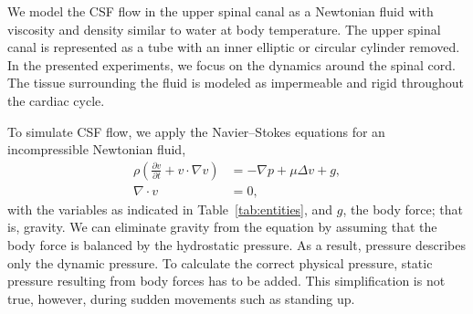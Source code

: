 We model the CSF flow in the upper spinal canal as a Newtonian fluid
 with viscosity and density similar to water
at body temperature. The upper spinal canal is represented as a tube
with an inner elliptic or circular cylinder removed.  In the presented
experiments, we focus on the dynamics around the spinal cord. The
tissue surrounding the fluid is modeled as impermeable and rigid
throughout the cardiac cycle.

To simulate CSF flow, we apply the
Navier--Stokes  equations for an incompressible
Newtonian fluid,
\begin{equation}
  \begin{split}
    \rho \left(\frac{\partial v}{\partial t} + v \cdot \nabla v \right)
          &= -\nabla p + \mu \Delta v + g,
    \\
    \nabla \cdot v &= 0,
  \end{split}
\end{equation}
with the variables as indicated in Table~\ref{tab:entities}, and $g$,
the body force; that is, gravity.  We can eliminate gravity from the
equation by assuming that the body force is balanced by the hydrostatic
pressure.  As a result, pressure describes only the dynamic pressure. To
calculate the correct physical pressure, static pressure resulting from
body forces has to be added. This simplification is not true, however,
during sudden movements such as standing up.

